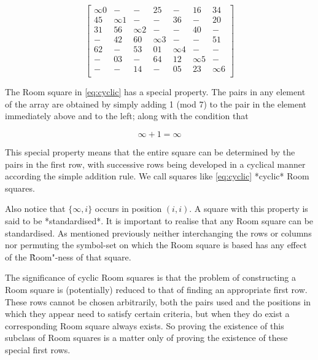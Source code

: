 \documentclass[
  11pt,
  a4paper]{book}\usepackage[]{graphicx}\usepackage[]{xcolor}
\begin{document}
\begin{equation}
  \begin{bmatrix}
    \infty 0 &     -    &     -    &     25     &     -    &     16     &    34    \\
      45     & \infty 1 &     -    &      -     &    36    &      -     &    20    \\
      31     &    56    & \infty 2 &      -     &     -    &     40     &     -    \\
       -     &    42    &    60    &  \infty 3  &     -    &      -     &    51    \\
      62     &     -    &    53    &     01     & \infty 4 &      -     &     -    \\
       -     &    03    &     -    &     64     &    12    &  \infty 5  &     -    \\
       -     &     -    &    14    &      -     &    05    &     23     & \infty 6 \\
  \end{bmatrix}
  \label{eq:cyclic}
\end{equation}

The Room square in \eqref{eq:cyclic} has a
special property. The pairs in any element of the array are
obtained by simply adding 1 (mod 7) to the pair in the
element immediately above and to the left; along with the
condition that

\begin{equation}
  \infty + 1 = \infty
\end{equation}

This special property means that the entire square can be
determined by the pairs in the first row, with successive
rows being developed in a cyclical manner according the
simple addition rule.  We call squares like \eqref{eq:cyclic} 
*cyclic* Room squares.

Also notice that $\{\infty,i\}$ occurs in position $(i,i)$.
A square with this property is said to be *standardised*. It
is important to realise that any Room square can be
standardised. As mentioned previously neither interchanging
the rows or columns nor permuting the symbol-set on which
the Room square is based has any effect of the
\`\`Room"-ness of that square.

The significance of cyclic Room squares is that the problem
of constructing a Room square is (potentially) reduced to
that of finding an appropriate first row. These rows cannot
be chosen arbitrarily, both the pairs used and the positions
in which they appear need to satisfy certain criteria, but
when they do exist a corresponding Room square always
exists. So proving the existence of this subclass of Room
squares is a matter only of proving the existence of these
special first rows.
\end{document}
